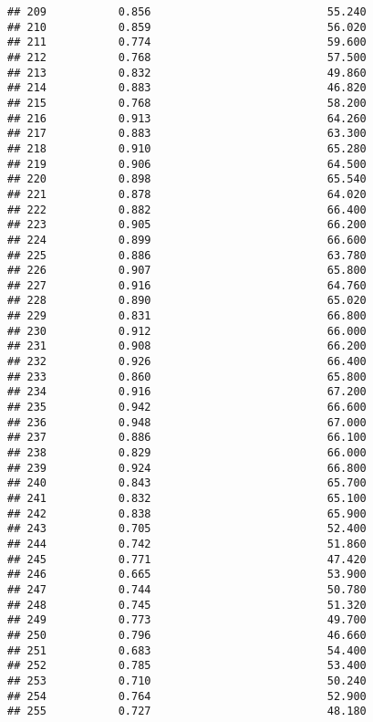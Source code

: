 \documentclass[
]{article}
\begin{document}
\begin{verbatim}
## 209           0.856                           55.240
## 210           0.859                           56.020
## 211           0.774                           59.600
## 212           0.768                           57.500
## 213           0.832                           49.860
## 214           0.883                           46.820
## 215           0.768                           58.200
## 216           0.913                           64.260
## 217           0.883                           63.300
## 218           0.910                           65.280
## 219           0.906                           64.500
## 220           0.898                           65.540
## 221           0.878                           64.020
## 222           0.882                           66.400
## 223           0.905                           66.200
## 224           0.899                           66.600
## 225           0.886                           63.780
## 226           0.907                           65.800
## 227           0.916                           64.760
## 228           0.890                           65.020
## 229           0.831                           66.800
## 230           0.912                           66.000
## 231           0.908                           66.200
## 232           0.926                           66.400
## 233           0.860                           65.800
## 234           0.916                           67.200
## 235           0.942                           66.600
## 236           0.948                           67.000
## 237           0.886                           66.100
## 238           0.829                           66.000
## 239           0.924                           66.800
## 240           0.843                           65.700
## 241           0.832                           65.100
## 242           0.838                           65.900
## 243           0.705                           52.400
## 244           0.742                           51.860
## 245           0.771                           47.420
## 246           0.665                           53.900
## 247           0.744                           50.780
## 248           0.745                           51.320
## 249           0.773                           49.700
## 250           0.796                           46.660
## 251           0.683                           54.400
## 252           0.785                           53.400
## 253           0.710                           50.240
## 254           0.764                           52.900
## 255           0.727                           48.180

\end{verbatim}
\end{document}
